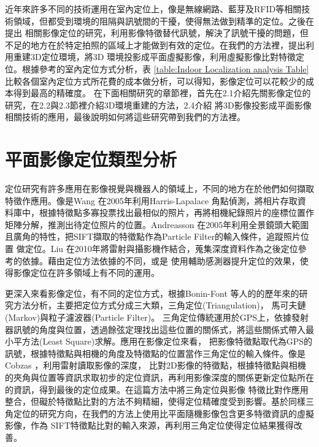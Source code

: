 
	近年來許多不同的技術運用在室內定位上，像是無線網路、藍芽及RFID等相關技術領域，但都受到環境的阻隔與訊號間的干擾，使得無法做到精準的定位。之後在提出
相關影像定位的研究，利用影像特徵替代訊號，解決了訊號干擾的問題，但不足的地方在於特定拍照的區域上才能做到有效的定位。在我們的方法裡，提出利用重建3D定位環境，將3D
環境投影成平面虛擬影像，利用虛擬影像比對特徵定位。根據參考\cite{Muthukrishnan05}的室內定位方式分析，表 \ref{table:Indoor Localization analysis Table}
比較各個室內定位方式所花費的成本做分析，可以得知，影像定位可以花較少的成本得到最高的精確度。
在下面相關研究的章節裡，首先在2.1介紹先關影像定位的研究，在2.2與2.3節裡介紹3D環境重建的方法，2.4介紹
將3D影像投影成平面影像相關技術的應用，最後說明如何將這些研究帶到我們的方法裡。



\section{平面影像定位類型分析}
	定位研究有許多應用在影像視覺與機器人的領域上，不同的地方在於他們如何擷取特徵作應用。像是Wang 在2005年\cite{Wang2005}利用Harris-Lapalace	
角點偵測，將相片存取資料庫中，根據特徵點多寡投票找出最相似的照片，再將相機紀錄照片的座標位置作矩陣分解，推測出待定位照片的位置。Andreasson
在2005年\cite{Andreasson2005}利用全景鏡頭大範圍且廣角的特性，把SIFT擷取的特徵點作為Particle Filter的輸入條件，追蹤照片位置
做定位。Liu 在2010年\cite{LiuT2010}將雷射與攝影機作結合，蒐集深度資料作為之後定位參考的依據。藉由定位方法依據的不同，或是
使用輔助感測器提升定位的效果，使得影像定位在許多領域上有不同的運用。

	更深入來看影像定位，有不同的定位方式，根據Bonin-Font 等人的\cite{Bonin-Font2008}的歷年來的研究方法分析，主要把定位方式分成三大類，三角定位(Triangulation)，
馬可夫鏈(Markov)與粒子濾波器(Particle Filter)。
三角定位傳統運用於GPS上，依據發射器訊號的角度與位置，透過餘弦定理找出這些位置的關係式，將這些關係式帶入最小平方法(Least Square)求解。應用在影像定位來看，
把影像特徵點取代為GPS的訊號，根據特徵點與相機的角度及特徵點的位置當作三角定位的輸入條件。像是Cobzas \cite{Cobzas2003}，利用雷射讀取影像的深度，
比對2D影像的特徵點，根據特徵點與相機的夾角與位置等資訊求取初步的定位資訊，再利用影像深度的關係更新定位點所在的資訊，得到最後的定位成果。在這篇方法中將三角定位與影像
特徵比對作應用整合，但礙於特徵點比對的方法不夠精細，使得定位精確度受到影響。基於同樣三角定位的研究方向，在我們的方法上使用比平面隨機影像包含更多特徵資訊的虛擬影像，作為
SIFT特徵點比對的輸入來源，再利用三角定位使得定位結果獲得改善。

